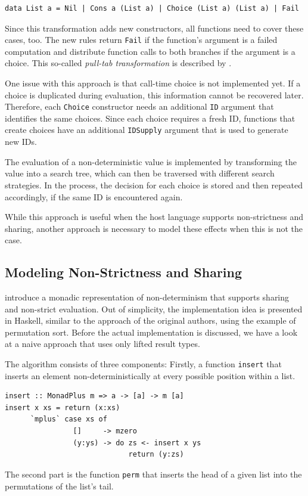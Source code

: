 \documentclass[a4paper, 11pt, fleqn, twoside, abstract=on]{scrreprt}
\newcommand{\hinl}[1]{\texttt{#1}}
\begin{document}
\begin{verbatim}
data List a = Nil | Cons a (List a) | Choice (List a) (List a) | Fail
\end{verbatim}

Since this transformation adds new constructors, all functions need to cover these cases, too.
The new rules return \hinl{Fail} if the function's argument is a failed computation and distribute function calls to both branches if the argument is a choice.
This so-called \textit{pull-tab transformation} is described by \citet{alqaddoumi2010ThePT}.

One issue with this approach is that call-time choice is not implemented yet.
If a choice is duplicated during evaluation, this information cannot be recovered later.
Therefore, each \hinl{Choice} constructor needs an additional \hinl{ID} argument that identifies the same choices.
Since each choice requires a fresh ID, functions that create choices have an additional \hinl{IDSupply} argument that is used to generate new IDs.

The evaluation of a non-deterministic value is implemented by transforming the value into a search tree, which can then be traversed with different search strategies.
In the process, the decision for each choice is stored and then repeated accordingly, if the same ID is encountered again.

While this approach is useful when the host language supports non-strictness and sharing, another approach is necessary to model these effects when this is not the case.

\subsection{Modeling Non-Strictness and Sharing}
\label{subsec:monadicLifting}
\citet{fischer2009purely} introduce a monadic representation of non-determinism that supports sharing and non-strict evaluation.
Out of simplicity, the implementation idea is presented in Haskell, similar to the approach of the original authors, using the example of permutation sort.
Before the actual implementation is discussed, we have a look at a naive approach that uses only lifted result types.

The algorithm consists of three components: Firstly, a function \hinl{insert} that inserts an element non-deterministically at every possible position within a list.

\begin{verbatim}
insert :: MonadPlus m => a -> [a] -> m [a]
insert x xs = return (x:xs)
      `mplus` case xs of
                []     -> mzero
                (y:ys) -> do zs <- insert x ys
                             return (y:zs)
\end{verbatim}
\noindent
The second part is the function \hinl{perm} that inserts the head of a given list into the permutations of the list's tail.
\end{document}
